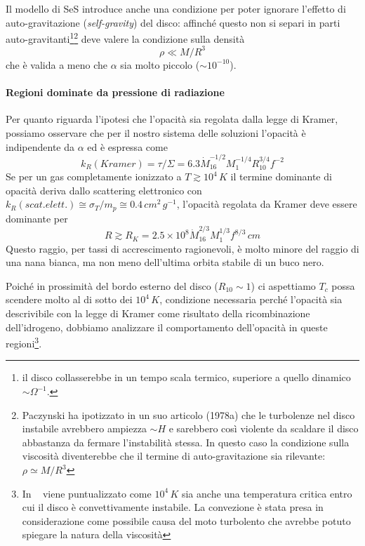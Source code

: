 \documentclass[a4paperbi]{article}
\begin{document}
	Il modello di SeS introduce anche una condizione per poter ignorare l'effetto di auto-gravitazione (\textit{self-gravity}) del disco: affinché questo non si separi in parti auto-gravitanti\footnote{il disco collasserebbe in un tempo scala termico, superiore a quello dinamico $\sim\Omega^{-1}$.}\footnote{Paczynski ha ipotizzato in un suo articolo (1978a) che le turbolenze nel disco instabile avrebbero ampiezza $\sim H$ e sarebbero così violente da scaldare il disco abbastanza da fermare l'instabilità stessa. In questo caso la condizione sulla viscosità diventerebbe che il termine di auto-gravitazione sia rilevante: $\rho\simeq M/R^3$} deve valere la condizione sulla densità
		\begin{equation}
			\rho\ll M/R^3
		\end{equation}
	che è valida a meno che $\alpha$ sia molto piccolo ($\sim10^{-10}$).
	
	\paragraph{Regioni dominate da pressione di radiazione}
	Per quanto riguarda l'ipotesi che l'opacità sia regolata dalla legge di Kramer, possiamo osservare che per il nostro sistema delle soluzioni l'opacità è indipendente da $\alpha$ ed è espressa come
	\begin{equation}
		k_R(Kramer)=\tau/\Sigma=6.3\dot{M}^{-1/2}_{16}M^{-1/4}_1R^{3/4}_{10}f^{-2}
	\end{equation}
	Se per un gas completamente ionizzato a $T\gtrsim10^4\,K$ il termine dominante di opacità deriva dallo scattering elettronico con $k_R(scat. elett.)\cong\sigma_T/m_p\cong0.4\,cm^2\,g^{-1}$, l'opacità regolata da Kramer deve essere dominante per	
	\begin{equation}
		R\gtrsim R_K=2.5\times10^8\dot{M}^{2/3}_{16}M^{1/3}_1f^{8/3}\,cm
	\end{equation}
	Questo raggio, per tassi di accrescimento ragionevoli, è molto minore del raggio di una nana bianca, ma non meno dell'ultima orbita stabile di un buco nero.
	
	Poiché in prossimità del bordo esterno del disco ($R_{10}\sim1$) ci aspettiamo $T_c$ possa scendere molto al di sotto dei $10^4\,K$, condizione necessaria perché l'opacità sia descrivibile con la legge di Kramer come risultato della ricombinazione dell'idrogeno, dobbiamo analizzare il comportamento dell'opacità in queste regioni\footnote{In ~\cite{Pringle1981} viene puntualizzato come $10^4\,K$ sia anche una temperatura critica entro cui il disco è convettivamente instabile. La convezione è stata presa in considerazione come possibile causa del moto turbolento che avrebbe potuto spiegare la natura della viscosità}.
	
\end{document}
